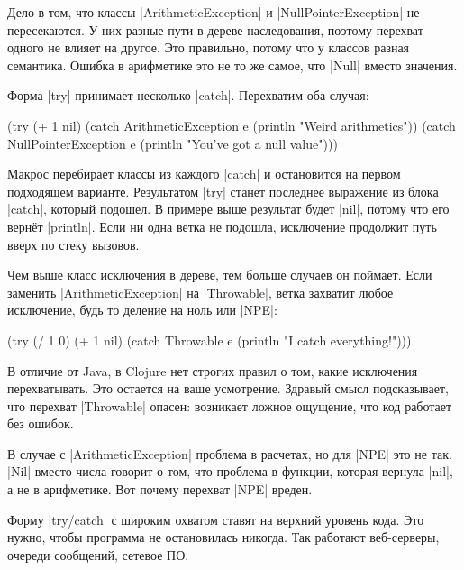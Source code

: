 Дело в том, что классы \spverb|ArithmeticException| и
\spverb|NullPointerException| не пересекаются. У них разные пути в дереве
наследования, поэтому перехват одного не влияет на другое. Это правильно, потому
что у классов разная семантика. Ошибка в арифметике это не то же самое, что
\spverb|Null| вместо значения.

Форма \spverb|try| принимает несколько \spverb|catch|. Перехватим оба случая:

\begin{english}
  \begin{clojure}
(try
  (+ 1 nil)
  (catch ArithmeticException e
    (println "Weird arithmetics"))
  (catch NullPointerException e
    (println "You've got a null value")))
  \end{clojure}
\end{english}

Макрос перебирает классы из каждого \spverb|catch| и остановится на первом
подходящем варианте. Результатом \spverb|try| станет последнее выражение из
блока \spverb|catch|, который подошел. В примере выше результат будет
\spverb|nil|, потому что его верн\"{е}т \spverb|println|. Если ни одна ветка не
подошла, исключение продолжит путь вверх по стеку вызовов.

Чем выше класс исключения в дереве, тем больше случаев он поймает. Если заменить
\spverb|ArithmeticException| на \spverb|Throwable|, ветка захватит любое
исключение, будь то деление на ноль или \spverb|NPE|:

\begin{english}
  \begin{clojure}
(try
  (/ 1 0)
  (+ 1 nil)
  (catch Throwable e
    (println "I catch everything!")))
  \end{clojure}
\end{english}

В отличие от Java, в Clojure нет строгих правил о том, какие исключения
перехватывать. Это остается на ваше усмотрение. Здравый смысл подсказывает, что
перехват \spverb|Throwable| опасен: возникает ложное ощущение, что код работает
без ошибок.

В случае с \spverb|ArithmeticException| проблема в расчетах, но для \spverb|NPE|
это не так. \spverb|Nil| вместо числа говорит о том, что проблема в функции,
которая вернула \spverb|nil|, а не в арифметике. Вот почему перехват
\spverb|NPE| вреден.

Форму \spverb|try/catch| с широким охватом ставят на верхний уровень кода. Это
нужно, чтобы программа не остановилась никогда. Так работают веб-серверы,
очереди сообщений, сетевое ПО.

